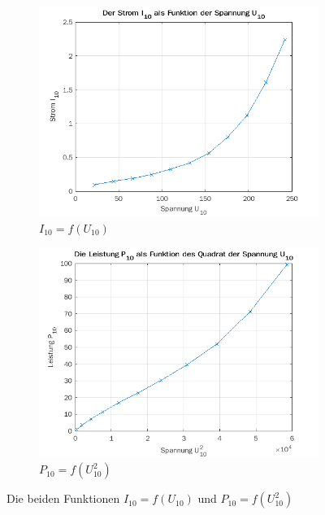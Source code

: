 \documentclass{article}
\begin{document}
\begin{figure}[h]
  \centering
  \begin{subfigure}{.45\textwidth}
    \centering
    \includegraphics[width=\linewidth]{../assets/images/gep3/u10_i10.png}
    \caption{$I_{10} = f(U_{10})$}
  \end{subfigure}
  \begin{subfigure}{.45\textwidth}
    \centering
    \includegraphics[width=\linewidth]{../assets/images/gep3/u10_p10.png}
    \caption{$P_{10} = f(U_{10}^{2})$}
  \end{subfigure}
  \label{fig:31_242}
  \caption{Die beiden Funktionen $I_{10} = f(U_{10})$ und $P_{10} = f(U_{10}^{2})$}
\end{figure}
\end{document}
